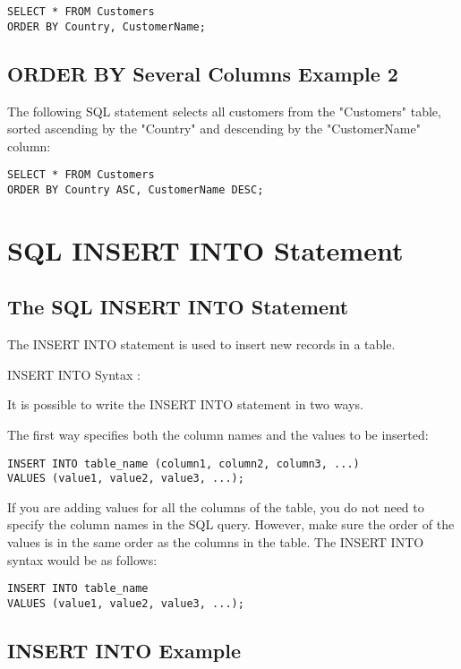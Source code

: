 \documentclass[a4paper,12pt]{article}
\begin{document}
\begin{lstlisting}
SELECT * FROM Customers
ORDER BY Country, CustomerName;
\end{lstlisting}


\subsection{ORDER BY Several Columns Example 2}

The following SQL statement selects all customers from the "Customers" table, sorted ascending by the "Country" and descending by the "CustomerName" column:


\begin{lstlisting}
SELECT * FROM Customers
ORDER BY Country ASC, CustomerName DESC;
\end{lstlisting}


\section{SQL INSERT INTO Statement}

\subsection{The SQL INSERT INTO Statement}

The INSERT INTO statement is used to insert new records in a table.

INSERT INTO Syntax :

It is possible to write the INSERT INTO statement in two ways.

The first way specifies both the column names and the values to be inserted:

\begin{lstlisting}
INSERT INTO table_name (column1, column2, column3, ...)
VALUES (value1, value2, value3, ...);
\end{lstlisting}

If you are adding values for all the columns of the table, you do not need to specify the column names in the SQL query. However, make sure the order of the values is in the same order as the columns in the table. The INSERT INTO syntax would be as follows:


\begin{lstlisting}
INSERT INTO table_name
VALUES (value1, value2, value3, ...);
\end{lstlisting}


\subsection{INSERT INTO Example}
\end{document}
